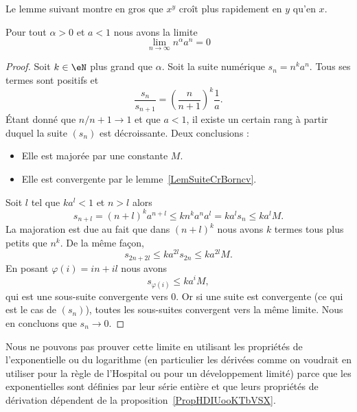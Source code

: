 Le lemme suivant montre en gros que \( x^y\) croît plus rapidement en \( y\) qu'en \( x\). 
\begin{lemma}       \label{LemLJOSooEiNtTs}
     Pour tout \( \alpha>0\) et \( a<1\) nous avons la limite
     \begin{equation}
         \lim_{n\to \infty} n^{\alpha}a^n=0
     \end{equation}
\end{lemma}

\begin{proof}
    Soit \( k\in \eN\) plus grand que \( \alpha\).
    Soit la suite numérique \( s_n=n^ka^n\). Tous ses termes sont positifs et
    \begin{equation}
        \frac{ s_n }{ s_{n+1} }=\left( \frac{ n }{ n+1 } \right)^k\frac{1}{ a }.
    \end{equation}
    Étant donné que \( n/n+1\to 1\) et que \( a<1\), il existe un certain rang à partir duquel la suite \( (s_n)\) est décroissante. Deux conclusions :
    \begin{itemize}
        \item Elle est majorée par une constante \( M\).
        \item Elle est convergente par le lemme~\ref{LemSuiteCrBorncv}.
    \end{itemize}
    Soit \( l\) tel que \( ka^l<1\) et \( n>l\) alors
    \begin{equation}
        s_{n+l}=(n+l)^ka^{n+l}\leq kn^ka^na^l=ka^ls_n\leq ka^lM.
    \end{equation}
    La majoration est due au fait que dans \( (n+l)^k\) nous avons \( k\) termes tous plus petits que \( n^k\). De la même façon,
    \begin{equation}
        s_{2n+2l}\leq ka^{2l}s_{2n}\leq ka^{2l}M.
    \end{equation}
    En posant \( \varphi(i)=in+il\) nous avons
    \begin{equation}
        s_{\varphi(i)}\leq ka^iM,
    \end{equation}
    qui est une sous-suite convergente vers \( 0\). Or si une suite est convergente (ce qui est le cas de \( (s_n)\)), toutes les sous-suites convergent vers la même limite. Nous en concluons que \( s_n\to 0\).
\end{proof}

\begin{remark}
    Nous ne pouvons pas prouver cette limite en utilisant les propriétés de l'exponentielle ou du logarithme (en particulier les dérivées comme on voudrait en utiliser pour la règle de l'Hospital ou pour un développement limité) parce que les exponentielles sont définies par leur série entière et que leurs propriétés de dérivation dépendent de la proposition~\ref{PropHDIUooKTbVSX}.
\end{remark}

